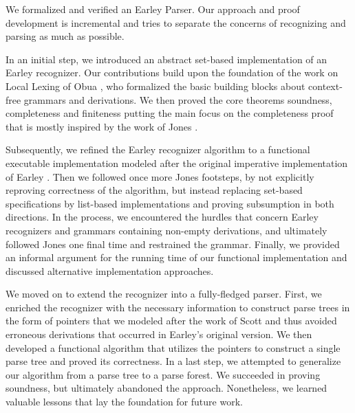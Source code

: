 %
\begin{isabellebody}%
%
%
\isadelimtheory
%
\endisadelimtheory
%
\isatagtheory
%
\endisatagtheory
{\isafoldtheory}%
%
\isadelimtheory
%
\endisadelimtheory
%
\isadelimdocument
%
\endisadelimdocument
%
\isatagdocument
%
\isamarkuptrue%
%
\isamarkuptrue%
%
\endisatagdocument
{\isafolddocument}%
%
\isadelimdocument
%
\endisadelimdocument
%
\begin{isamarkuptext}%
We formalized and verified an Earley Parser. Our approach and proof development is incremental and
tries to separate the concerns of recognizing and parsing as much as possible.

In an initial step, we introduced an abstract set-based implementation of an Earley recognizer. Our contributions
build upon the foundation of the work on Local Lexing of Obua \cite{Obua:2017} \cite{LocalLexing-AFP},
who formalized the basic building blocks about context-free grammars and derivations. We then proved
the core theorems soundness, completeness and finiteness putting the main focus on the completeness proof
that is mostly inspired by the work of Jones \cite{Jones:1972}.

Subsequently, we refined the Earley recognizer algorithm to a functional executable implementation modeled
after the original imperative implementation of Earley \cite{Earley:1970}. Then we followed once more
Jones footsteps, by not explicitly reproving correctness of the algorithm, but instead replacing set-based
specifications by list-based implementations and proving subsumption in both directions. In the process,
we encountered the hurdles that concern Earley recognizers and grammars containing non-empty derivations, and
ultimately followed Jones one final time and restrained the grammar. Finally, we provided an informal argument
for the running time of our functional implementation and discussed alternative implementation approaches.

We moved on to extend the recognizer into a fully-fledged parser. First, we enriched the recognizer with
the necessary information to construct parse trees in the form of pointers that we modeled after the work
of Scott \cite{Scott:2008} and thus avoided erroneous derivations that occurred in Earley's original
version. We then developed a functional algorithm that utilizes the pointers to construct a single parse tree
and proved its correctness. In a last step, we attempted to generalize our algorithm from a parse tree to
a parse forest. We succeeded in proving soundness, but ultimately abandoned the approach.
Nonetheless, we learned valuable lessons that lay the foundation for future work.


\end{isamarkuptext}
\end{isabellebody}
